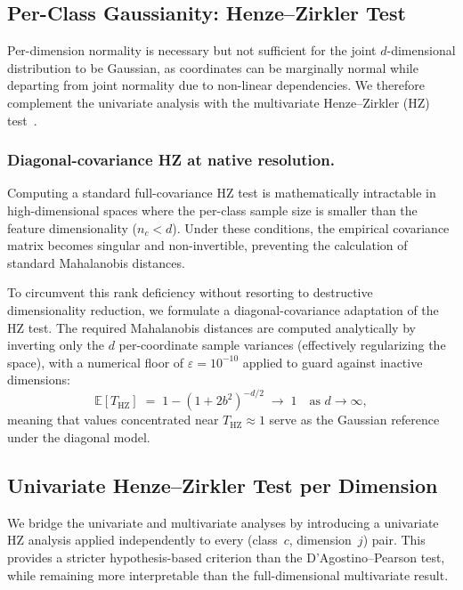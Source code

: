 \subsection{Per-Class Gaussianity: Henze--Zirkler Test}
\label{sec:method:gaussianity:multivariate}

Per-dimension normality is necessary but not sufficient for the joint $d$-dimensional distribution to be Gaussian, as coordinates can be marginally normal while departing from joint normality due to non-linear dependencies. We therefore complement the univariate analysis with the multivariate Henze--Zirkler (HZ) test~\cite{henze1990class}.

\subsubsection{Diagonal-covariance HZ at native resolution.}
Computing a standard full-covariance HZ test is mathematically intractable in high-dimensional spaces where the per-class sample size is smaller than the feature dimensionality ($n_c < d$). Under these conditions, the empirical covariance matrix becomes singular and non-invertible, preventing the calculation of standard Mahalanobis distances.

To circumvent this rank deficiency without resorting to destructive dimensionality reduction, we formulate a diagonal-covariance adaptation of the HZ test. The required Mahalanobis distances are computed analytically by inverting only the $d$ per-coordinate sample variances (effectively regularizing the space), with a numerical floor of $\varepsilon=10^{-10}$ applied to guard against inactive dimensions:
\begin{equation}
	\mathbb{E}[T_{\mathrm{HZ}}] \;=\; 1 - (1+2b^2)^{-d/2} \;\to\; 1 \quad \text{as } d \to \infty,
	\label{eq:hz_expected}
\end{equation}
meaning that values concentrated near $T_{\mathrm{HZ}} \approx 1$ serve as the Gaussian reference under the diagonal model.


\subsection{Univariate Henze--Zirkler Test per Dimension}
\label{sec:method:gaussianity:hz_univariate}

We bridge the univariate and multivariate analyses by introducing a univariate HZ analysis applied independently to every (class~$c$, dimension~$j$) pair. This provides a stricter hypothesis-based criterion than the D'Agostino--Pearson test, while remaining more interpretable than the full-dimensional multivariate result.

